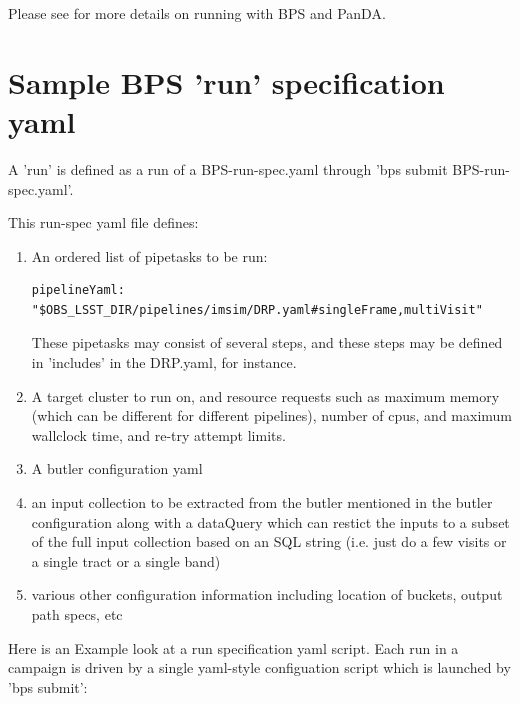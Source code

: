 \documentclass[DM,authoryear,toc]{lsstdoc}
\begin{document}
Please see \cite{DMTN-168} for more details on running with BPS and PanDA.

\section{Sample BPS 'run' specification yaml}

A 'run' is defined as a run of a BPS-run-spec.yaml through 'bps submit
BPS-run-spec.yaml'.

This run-spec yaml file defines:

\begin{enumerate}

\item An ordered list of pipetasks to be run: 
\begin{verbatim}
pipelineYaml: 
"$OBS_LSST_DIR/pipelines/imsim/DRP.yaml#singleFrame,multiVisit"
\end{verbatim}
These pipetasks may consist of several steps, and these steps may be defined
in 'includes' in the DRP.yaml, for instance.

\item A target cluster to run on, and resource requests such as 
maximum memory (which can be different for different pipelines), number of cpus,
and maximum wallclock time, and re-try attempt limits.

\item A butler configuration yaml

\item an input collection to be extracted from the butler mentioned in
the butler configuration along with a dataQuery which can restict the inputs
to a subset of the full input collection based on 
an SQL string (i.e. just do a few visits or a single tract
or a single band)

\item various other configuration information including location of 
buckets, output path specs, etc

\end{enumerate}

Here is an Example look at a run specification yaml script. Each run in a
campaign is driven by a single yaml-style configuation script which is 
launched by 'bps submit':
\end{document}
